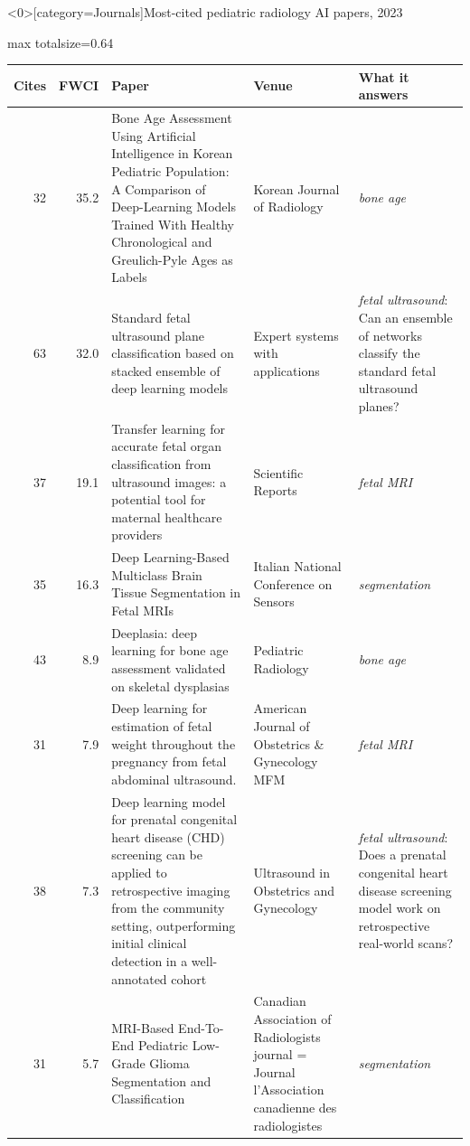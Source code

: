 \documentclass[aspectratio=169]{beamer}
\renewcommand{\arraystretch}{1.08}
\begin{document}
\begin{frame}<0>[category=Journals]{Most-cited pediatric radiology AI papers, 2023}
\tiny
\begin{adjustbox}{max totalsize={\textwidth}{0.64\textheight}}
\renewcommand{\arraystretch}{1.2}
\begin{tabular}{|r|r|>{\raggedright\arraybackslash}p{}|>{\raggedright\arraybackslash}p{}|>{\raggedright\arraybackslash}p{}|}
\hline \textbf{Cites} & \textbf{FWCI} & \textbf{Paper} & \textbf{Venue} & \textbf{What it answers} \\ \hline
32 & 35.2 & Bone Age Assessment Using Artificial Intelligence in Korean Pediatric Population: A Comparison of Deep-Learning Models Trained With Healthy Chronological and Greulich-Pyle Ages as Labels & Korean Journal of Radiology & \textit{bone age} \\ \hline
63 & 32.0 & Standard fetal ultrasound plane classification based on stacked ensemble of deep learning models & Expert systems with applications & \textit{fetal ultrasound}: Can an ensemble of networks classify the standard fetal ultrasound planes? \\ \hline
37 & 19.1 & Transfer learning for accurate fetal organ classification from ultrasound images: a potential tool for maternal healthcare providers & Scientific Reports & \textit{fetal MRI} \\ \hline
35 & 16.3 & Deep Learning-Based Multiclass Brain Tissue Segmentation in Fetal MRIs & Italian National Conference on Sensors & \textit{segmentation} \\ \hline
43 & 8.9 & Deeplasia: deep learning for bone age assessment validated on skeletal dysplasias & Pediatric Radiology & \textit{bone age} \\ \hline
31 & 7.9 & Deep learning for estimation of fetal weight throughout the pregnancy from fetal abdominal ultrasound. & American Journal of Obstetrics \& Gynecology MFM & \textit{fetal MRI} \\ \hline
38 & 7.3 & Deep learning model for prenatal congenital heart disease (CHD) screening can be applied to retrospective imaging from the community setting, outperforming initial clinical detection in a well-annotated cohort & Ultrasound in Obstetrics and Gynecology & \textit{fetal ultrasound}: Does a prenatal congenital heart disease screening model work on retrospective real-world scans? \\ \hline
31 & 5.7 & MRI-Based End-To-End Pediatric Low-Grade Glioma Segmentation and Classification & Canadian Association of Radiologists journal = Journal l'Association canadienne des radiologistes & \textit{segmentation} \\ \hline

\end{tabular}
\end{adjustbox}
\end{frame}
\end{document}
